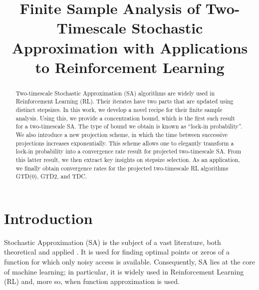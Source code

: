 \documentclass[usenames,dvipsnames,final,12pt]{colt2018} %
\title[Two-Timescale Stochastic Approximation]{Finite Sample Analysis of Two-Timescale Stochastic Approximation with Applications to Reinforcement Learning}
\newcommand{\gugan}[1]{#1}
\begin{document}

\maketitle


\begin{abstract}
Two-timescale Stochastic Approximation (SA) algorithms are widely used in Reinforcement Learning (RL). Their iterates have two parts that are updated using distinct stepsizes. In this work, we develop a novel recipe for their finite sample analysis. Using this, we provide a concentration bound, which is the first such result for a two-timescale SA. The type of bound we obtain is known as ``lock-in probability''. We also introduce a new projection scheme, in which the time between successive projections increases exponentially. This scheme allows one to elegantly transform a lock-in probability into a convergence rate result for projected two-timescale SA. From this latter result, we then extract key insights on stepsize selection.  As an application, we finally obtain convergence rates for the projected two-timescale RL algorithms GTD(0), GTD2, and TDC.
\end{abstract}


\section{Introduction}

Stochastic Approximation (SA) is the subject of a vast literature, both theoretical and applied \citep{kushner1997stochatic}. It is used for finding optimal points or zeros of a function for which only noisy access is available. Consequently, SA lies at the core of  machine learning; \gugan{in particular, it is widely used in Reinforcement Learning (RL) and, more so, when function approximation is used.}
\end{document}
